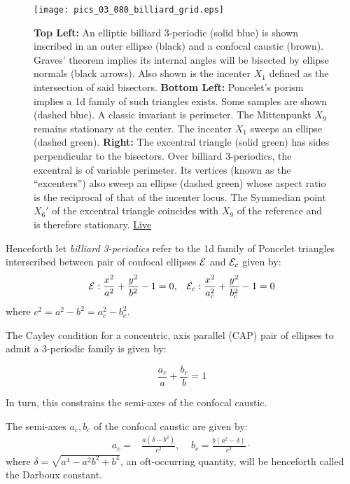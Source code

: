 \begin{figure}
    \centering
    \texttt{[image: pics\_03\_080\_billiard\_grid.eps]}
    \caption{\textbf{Top Left:} An elliptic billiard 3-periodic (solid blue) is shown inscribed in an outer ellipse (black) and a confocal caustic (brown). Graves' theorem implies its internal angles will be bisected by ellipse normals (black arrows). Also shown is the incenter $X_1$ defined as the intersection of said bisectors. \textbf{Bottom Left:} Poncelet's porism implies a 1d family of such triangles exists. Some samples are shown (dashed blue). A classic invariant is  perimeter. The Mittenpunkt $X_9$ remains stationary at the center. The incenter $X_1$ sweeps an ellipse (dashed green). \textbf{Right:} The excentral triangle (solid green) has sides perpendicular to the bisectors. Over billiard 3-periodics, the excentral is of variable perimeter. Its vertices (known as the ``excenters'') also sweep an ellipse (dashed green) whose aspect ratio is the reciprocal of that of the incenter locus. The Symmedian point $X_6'$ of the excentral triangle coincides with $X_9$ of the reference and is therefore stationary. \href{https://bit.ly/3gWl3CI}{Live}}
    \label{fig:billiard-grid}
\end{figure}

Henceforth let {\em billiard 3-periodics} refer to the 1d family of Poncelet triangles interscribed between pair of confocal ellipses $\mathcal{E}$ and $\mathcal{E}_c$ given by:
\[ \mathcal{E}:\frac{x^2}{a^2}+\frac{y^2}{b^2}-1=0,\;\;\;\mathcal{E}_c:\frac{x^2}{a_c^2}+\frac{y^2}{b_c^2}-1=0\]
where $c^2=a^2-b^2=a_c^2-b_c^2$.

The Cayley condition for a concentric, axis parallel (CAP) pair of ellipses to admit a 3-periodic family is given by:

\begin{equation} \frac{a_c}{a}+\frac{b_c}{b}=1
\label{eqn:n3-cayley}
\end{equation}

In turn, this constrains the semi-axes of the confocal caustic.

\begin{proposition}
The semi-axes $a_c,b_c$ of the confocal caustic are given by:
\begin{align*}
a_c=&\frac{a\left(\delta-{b}^{2}\right)}{c^2},\;\;\;\;
b_c=\frac{b\left({a}^{2}-\delta\right)}{c^2}\cdot
\end{align*}
where $\delta=\sqrt{a^4-a^2b^2+b^4}$, an oft-occurring quantity, will be henceforth called the Darboux constant.
\label{prop:03-n3-caustic}
\end{proposition}

